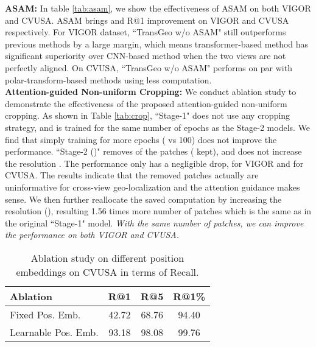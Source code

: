 \documentclass[10pt,twocolumn,letterpaper]{article}
\begin{document}
\noindent\textbf{ASAM:} In table \ref{tab:asam}, we show the effectiveness of ASAM on both VIGOR and CVUSA. ASAM brings  and  R@1 improvement on VIGOR and CVUSA respectively. For VIGOR dataset, ``TransGeo w/o ASAM" still outperforms previous methods by a large margin, which means transformer-based method has significant superiority over CNN-based method when the two views are not perfectly aligned. On CVUSA, ``TransGeo w/o ASAM" performs on par with polar-transform-based methods using less computation.  \\
\noindent\textbf{Attention-guided Non-uniform Cropping:} We conduct ablation study to demonstrate the effectiveness of the proposed attention-guided non-uniform cropping. As shown in Table \ref{tab:crop}, ``Stage-1" does not use any cropping strategy, and is trained for the same number of epochs as the Stage-2 models. We find that simply training for more epochs ( vs 100) does not improve the performance. ``Stage-2 ()" removes  of the patches ( kept), and does not increase the resolution . The performance only has a negligible drop, \ie  for VIGOR and  for CVUSA. The results indicate that the removed patches actually are uninformative for cross-view geo-localization and the attention guidance makes sense. We then further reallocate the saved computation by increasing the resolution (), resulting 1.56 times more number of patches which is the same as in the original ``Stage-1" model. \emph{With the same number of patches, we can improve the performance on both VIGOR and CVUSA.} \\
\begin{table}[!htbp]
\centering
    \begin{tabular}{l c c c} 
    \hline
    
    \hline
    Ablation & R@1 & R@5 & R@1\% \\
    \hline
Fixed Pos. Emb.  & 42.72 & 68.76 & 94.40 \\
        Learnable Pos. Emb. & 93.18 & 98.08 & 99.76 \\
    \hline
    
    \hline
    \end{tabular}
    \caption{Ablation study on different position embeddings on CVUSA in terms of Recall. }\vspace{-0.2cm}
    \label{tab:position}
\end{table}
\end{document}
